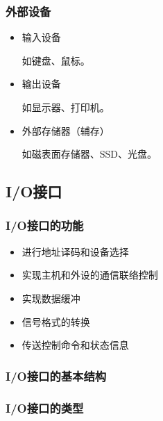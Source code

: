 \documentclass[12pt, a4paper, oneside]{ctexart}
\begin{document}
\subsubsection{外部设备}

\begin{itemize}
  \item 输入设备
  
  如键盘、鼠标。

  \item 输出设备
  
  如显示器、打印机。

  \item 外部存储器（辅存）

  如磁表面存储器、SSD、光盘。
\end{itemize}

\subsection{I/O接口}

\subsubsection{I/O接口的功能}

\begin{itemize}
  \item 进行地址译码和设备选择
  \item 实现主机和外设的通信联络控制
  \item 实现数据缓冲
  \item 信号格式的转换
  \item 传送控制命令和状态信息
\end{itemize}

\subsubsection{I/O接口的基本结构}

\subsubsection{I/O接口的类型}
\end{document}
